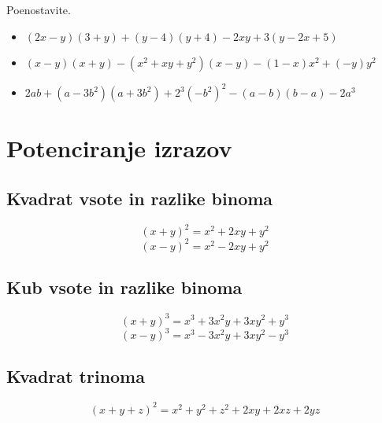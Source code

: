 \begin{multicols}{2}
            ~\\~\\~\\~\\~\\~\\~
        
        \end{multicols}
        
            \begin{naloga}
                Poenostavite.
                \begin{itemize}
                    \item $(2x-y)(3+y)+(y-4)(y+4)-2xy+3(y-2x+5)$ 
                    \item $(x-y)(x+y)-(x^2+xy+y^2)(x-y)-(1-x)x^2+(-y)y^2$ 
                    \item $2ab+(a-3b^2)(a+3b^2)+2^3(-b^2)^2-(a-b)(b-a)-2a^3$  
                \end{itemize}
            \end{naloga}
        

\newpage
\section{Potenciranje izrazov}

            
                \subsection*{Kvadrat vsote in razlike binoma}
                    $$ (x+y)^2=x^2+2xy+y^2 $$
                    $$ (x-y)^2=x^2-2xy+y^2 $$
                
        
                \subsection*{Kub vsote in razlike binoma}
                    $$ (x+y)^3=x^3+3x^2y+3xy^2+y^3 $$
                    $$ (x-y)^3=x^3-3x^2y+3xy^2-y^3 $$
                
        
                \subsection*{Kvadrat trinoma}
                    $$ (x+y+z)^2=x^2+y^2+z^2+2xy+2xz+2yz $$
                
            
        
